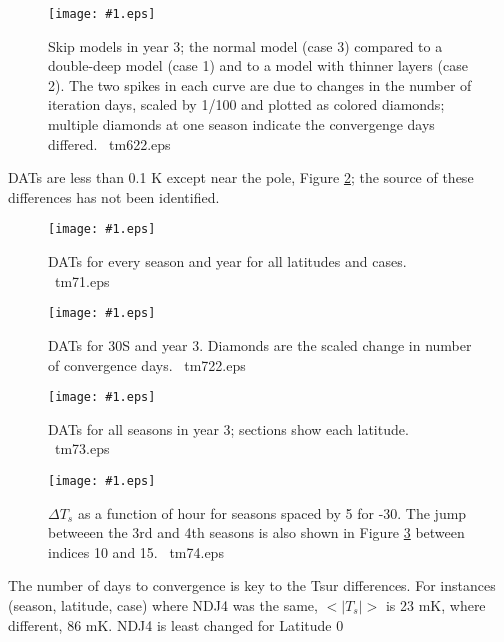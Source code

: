 \documentclass{article}  %
\newcommand{\igc}[1]{\texttt{[image: \#1.eps]}}  %
\begin{document}
\begin{figure}[!ht] \igc{img/tm622}
\caption[Deep or thin]{Skip models in year 3; the normal model (case 3) compared
  to a double-deep model (case 1) and to a model with thinner layers (case
  2). The two spikes in each curve are due to changes in the number of iteration
  days, scaled by 1/100 and plotted as colored diamonds; multiple diamonds at
  one season indicate the convergenge days differed.  \ tm622.eps \label{tm622}
} \end{figure}

DATs are less than 0.1 K except near the pole, Figure \ref{tm71}; the source of
these differences has not been identified.
 
\begin{figure}[!ht] \igc{img/tm71}
\caption[All DATs]{DATs for every season and year for all latitudes and cases.
  \ tm71.eps \label{tm71} } \end{figure}


\begin{figure}[!ht]  \igc{img/tm722}
\caption[DATs at 30\qd S, year 3]{DATs for 30\qd S and year 3. Diamonds are the
  scaled change in number of convergence days. \ tm722.eps \label{tm722}
} \end{figure}


\begin{figure}[!ht] \igc{img/tm73}
\caption[DATs year 3 each Lat.]{DATs for all seasons in year 3; sections show
  each latitude.  \ tm73.eps \label{tm73} } \end{figure}


\begin{figure}[!ht] \igc{img/tm74}
\caption[$\Delta T_s$ vrs hour]{$\Delta T_s$ as a function of hour for seasons
  spaced by 5 for -30\qd. The jump betweeen the 3rd and 4th seasons is also
  shown in Figure \ref{tm722} between indices 10 and 15.
  \ tm74.eps \label{tm74} } \end{figure}


The number of days to convergence is key to the Tsur differences. For instances
(season, latitude, case) where NDJ4 was the same, $<|T_s|>$ is 23 mK, where
different, 86 mK. NDJ4 is least changed for Latitude 0
\end{document}
